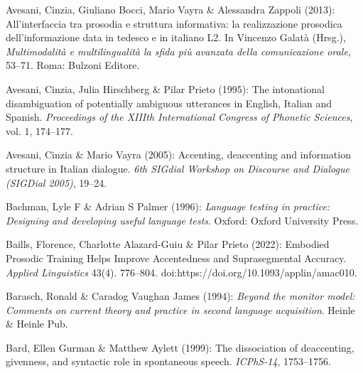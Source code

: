 \begin{styleBibliography}
Avesani, Cinzia, Giuliano Bocci, Mario Vayra \& Alessandra Zappoli (2013): All’interfaccia tra prosodia e struttura informativa: la realizzazione prosodica dell’informazione data in tedesco e in italiano L2. In Vincenzo Galatà (Hrsg.), \textit{Multimodalità e multilingualità la sfida più avanzata della comunicazione orale}, 53–71. Roma: Bulzoni Editore.
\end{styleBibliography}

\begin{styleBibliography}
Avesani, Cinzia, Julia Hirschberg \& Pilar Prieto (1995): The intonational disambiguation of potentially ambiguous utterances in English, Italian and Spanish. \textit{Proceedings of the XIIIth International Congress of Phonetic Sciences}, vol. 1, 174–177.
\end{styleBibliography}

\begin{styleBibliography}
Avesani, Cinzia \& Mario Vayra (2005): Accenting, deaccenting and information structure in Italian dialogue. \textit{6th SIGdial Workshop on Discourse and Dialogue (SIGDial 2005)}, 19–24.
\end{styleBibliography}

\begin{styleBibliography}
Bachman, Lyle F \& Adrian S Palmer (1996): \textit{Language testing in practice: Designing and developing useful language tests}. Oxford: Oxford University Press.
\end{styleBibliography}

\begin{styleBibliography}
Baills, Florence, Charlotte Alazard-Guiu \& Pilar Prieto (2022): Embodied Prosodic Training Helps Improve Accentedness and Suprasegmental Accuracy. \textit{Applied Linguistics} 43(4). 776–804. doi:https://doi.org/10.1093/applin/amac010.
\end{styleBibliography}

\begin{styleBibliography}
Barasch, Ronald \& Caradog Vaughan James (1994): \textit{Beyond the monitor model: Comments on current theory and practice in second language acquisition}. Heinle \& Heinle Pub.
\end{styleBibliography}

\begin{styleBibliography}
Bard, Ellen Gurman \& Matthew Aylett (1999): The dissociation of deaccenting, givenness, and syntactic role in spontaneous speech. \textit{ICPhS-14}, 1753–1756.
\end{styleBibliography}

